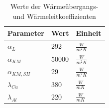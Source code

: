 \begin{table}[h!]
\centering
\caption{Werte der Wärmeübergangs- und Wärmeleitkoeffizienten}
\label{tab:Werte der Wärmeübergangs- und Wärmeleitzahlen}
\renewcommand{\arraystretch}{1.2}
\begin{tabular}{|l|l|l|}

\hline
Parameter        & Wert  & Einheit           \\ \hline
$\alpha_{L}$     & 292   & $\frac{W}{m^2 K}$ \\
$\alpha_{KM}$    & 50000 & $\frac{W}{m^2 K}$ \\
$\alpha_{KM,SH}$ & 29    & $\frac{W}{m^2 K}$ \\
$\lambda_{Cu}$   & 380   & $\frac{W}{m K}$   \\
$\lambda_{Al}$   & 220   & $\frac{W}{m K}$   \\ \hline
\end{tabular}
\end{table}

